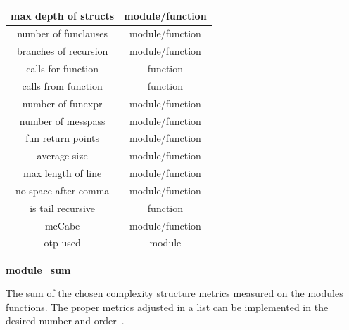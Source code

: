\begin{table}[!htb]
{\begin{tabular}{|c|c|}
		  	\hline
		  	max depth of structs		& module/function		  			  
		  	\\		  			

		  	\hline
		  	number of funclauses		& module/function		  			  
		  	\\			
	
		  	\hline
		  	branches of recursion		& module/function		  			  
		  	\\			

		  	\hline
		  	calls for function			& function		  			  
		  	\\			
			
		  	\hline
		  	calls from function			& function		  			  
		  	\\	

		  	\hline
		  	number of funexpr			& module/function		  			  
		  	\\
		  	
		  	\hline
		  	number of messpass			& module/function		  			  
		  	\\		  	

		  	\hline
		  	fun return points			& module/function		  			  
		  	\\	
		  	
		  	\hline
		  	average size				& module/function		  			  
		  	\\		  		  	

		  	\hline
		  	max length of line			& module/function		  			  
		  	\\
		  	
		  	\hline
		  	no space after comma		& module/function		  			  
		  	\\	
		  	
		  	\hline
		  	is tail recursive			& function		  			  
		  	\\		  	

		  	\hline
		  	mcCabe						& module/function		  			  
		  	\\	
		  			  	
		  	\hline
		  	otp used						& module		  			  
		  	\\			  	
		  	\hline		  		  			  				
		\end{tabular}}
	\end{table}

\textbf{module\_sum}

The sum of the chosen complexity structure metrics measured on the modules functions. The proper metrics adjusted in a list can be implemented in the desired number and order~\cite{refactorerlm}.

